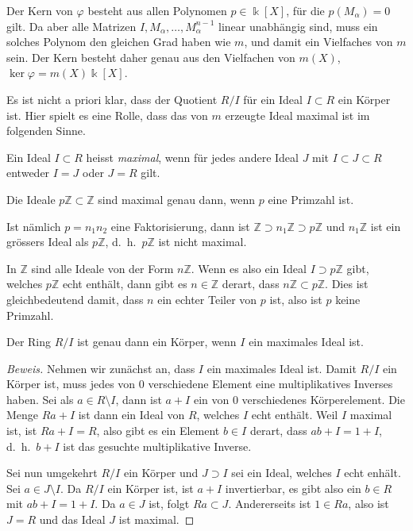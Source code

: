 Der Kern von $\varphi$ besteht aus allen Polynomen $p\in\Bbbk[X]$,
für die $p(M_\alpha)=0$ gilt.
Da aber alle Matrizen $I,M_\alpha,\dots,M_\alpha^{n-1}$ linear
unabhängig sind, muss ein solches Polynom den gleichen Grad haben
wie $m$, und damit ein Vielfaches von $m$ sein.
Der Kern besteht daher genau aus den Vielfachen von $m(X)$,
$\ker\varphi = m(X)\Bbbk[X]$.

Es ist nicht a priori klar, dass der Quotient $R/I$ für ein
Ideal $I\subset R$ ein Körper ist.
Hier spielt es eine Rolle, dass das von $m$ erzeugte Ideal
maximal ist im folgenden Sinne.

\begin{definition}
Ein Ideal $I\subset R$ heisst {\em maximal}, wenn für jedes andere Ideal
$J$ mit $I\subset J\subset R$ entweder $I=J$ oder $J=R$ gilt.
\end{definition}

\begin{beispiel}
Die Ideale $p\mathbb{Z}\subset \mathbb{Z}$ sind maximal genau dann, wenn
$p$ eine Primzahl ist.

Ist nämlich $p=n_1n_2$ eine Faktorisierung, dann ist
$\mathbb{Z}\supset n_1\mathbb{Z} \supset p\mathbb{Z}$ 
und $n_1\mathbb{Z}$ ist ein grössers Ideal als $p\mathbb{Z}$,
d.~h.~$p\mathbb{Z}$ ist nicht maximal.

In $\mathbb{Z}$ sind alle Ideale von der Form $n\mathbb{Z}$.
Wenn es also ein Ideal $I\supset p\mathbb{Z}$ gibt, welches
$p\mathbb{Z}$ echt enthält, dann gibt es $n\in\mathbb{Z}$ derart,
dass $n\mathbb{Z} \subset p\mathbb{Z}$.
Dies ist gleichbedeutend damit, dass $n$ ein echter Teiler von $p$
ist, also ist $p$ keine Primzahl.
\end{beispiel}

\begin{satz}
Der Ring $R/I$ ist genau dann ein Körper, wenn $I$ ein maximales Ideal ist.
\end{satz}

\begin{proof}[Beweis]
Nehmen wir zunächst an, dass $I$ ein maximales Ideal ist.
Damit $R/I$ ein Körper ist, muss jedes von $0$ verschiedene Element 
eine multiplikatives Inverses haben.
Sei als $a\in R\setminus I$, dann ist $a+I$ ein von $0$ verschiedenes
Körperelement.
Die Menge $Ra+I$ ist dann ein Ideal von $R$, welches $I$ echt enthält.
Weil $I$ maximal ist, ist $Ra+I=R$, also gibt es ein Element $b\in I$
derart, dass $ab+I=1+I$, d.~h.~$b+I$ ist das gesuchte multiplikative 
Inverse.

Sei nun umgekehrt $R/I$ ein Körper und $J\supset I$ sei ein Ideal,
welches $I$ echt enhält.
Sei $a\in J\setminus I$.
Da $R/I$ ein Körper ist, ist $a+I$ invertierbar, es gibt also ein
$b\in R$ mit $ab+I=1+I$.
Da $a\in J$ ist, folgt $Ra\subset J$.
Andererseits ist $1\in Ra$, also ist $J=R$ und das Ideal $J$ ist maximal.
\end{proof}

